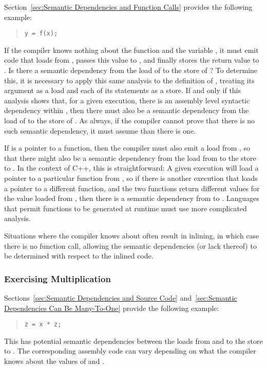 Section~\ref{sec:Semantic Dependencies and Function Calls}
provides the following example:
\begin{quote}
\begin{verbatim}
y = f(x);
\end{verbatim}
\end{quote}
If the compiler knows nothing about the function  and the variable
, it must emit code that loads from , passes this value to
, and finally stores the return value to .
Is there a semantic dependency from the load of  to the store of
?
To determine this, it is necessary to apply this same analysis to the
definition of , treating its argument as a load and each of its
 statements as a store.
If and only if this analysis shows that, for a given execution, there
is an assembly level syntactic dependency within , then there
must also be a semantic dependency from the load of  to the store
of .
As always, if the compiler cannot prove that there is no such semantic
dependency, it must assume than there is one.

If  is a pointer to a function, then the compiler must also emit
a load from , so that there might also be a semantic dependency
from the load from  to the store to .
In the context of C++, this is straightforward:
A given execution will load a pointer to a particular function from
, so if there is another execution that loads a pointer to a
different function, and the two functions return different values for
the value loaded from , then there is a semantic dependency from
 to .
Languages that permit functions to be generated at runtime must use
more complicated analysis.

Situations where the compiler knows about  often result in
inlining, in which case there is no function call, allowing the semantic
dependencies (or lack thereof) to be determined with respect to the
inlined code.

\subsubsection{Exercising Multiplication}
\label{sec:Exercising Multiplication}

Sections~\ref{sec:Semantic Dependencies and Source Code}
and~\ref{sec:Semantic Dependencies Can Be Many-To-One}
provide the following example:
\begin{quote}
\begin{verbatim}
z = x * z;
\end{verbatim}
\end{quote}
This has potential semantic dependencies between the loads from 
and  to the store to .
The corresponding assembly code can vary depending on what the compiler
knows about the values of  and .

